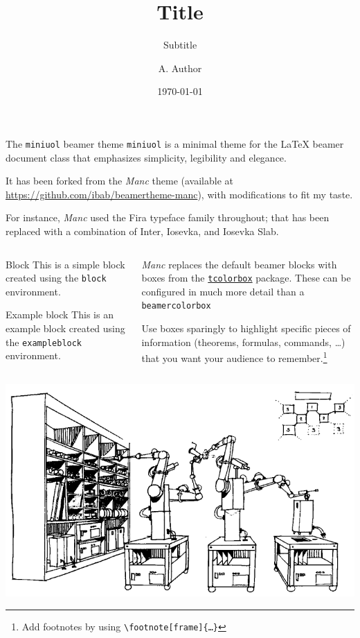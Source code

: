 \documentclass{beamer}
\title{Title}
\subtitle{Subtitle}
\date{\today}
\author{A. Author}
\institute{Institute}
\begin{document}
\begin{frame}
	\titlepage
\end{frame}

\begin{frame}{The \texttt{miniuol} beamer theme}
	\texttt{miniuol} is a minimal theme for the \LaTeX{} beamer document class that emphasizes simplicity, legibility and elegance.

	It has been forked from the \emph{Manc} theme (available at \url{https://github.com/ibab/beamertheme-manc}), with modifications to fit my taste.

	For instance, \emph{Manc} used the Fira typeface family throughout; that has been replaced with a combination of Inter, Iosevka, and Iosevka Slab.
\end{frame}

\begin{frame}[fragile]
	\begin{columns}
		\begin{column}{0.5\textwidth}
			\begin{block}{Block}
				This is a simple block created using the \texttt{block} environment.
			\end{block}
			\begin{exampleblock}{Example block}
				This is an example block created using the \texttt{exampleblock} environment.
			\end{exampleblock}
		\end{column}
		\begin{column}{0.5\textwidth}
			\emph{Manc} replaces the default beamer blocks with boxes from the \href{https://www.ctan.org/pkg/tcolorbox}{\texttt{tcolorbox}} package.
			These can be configured in much more detail than a \texttt{beamercolorbox}
			\medskip

			Use boxes sparingly to highlight specific pieces of information (theorems, formulas, commands, …) that you want your audience to remember.\footnote[frame]{Add footnotes by using \texttt{\backslash footnote[frame]\{…\}}}
		\end{column}
	\end{columns}
\end{frame}

\begin{frame}
	\centering
	\includegraphics[width = \textwidth]{./graphics/self-replicating.png}
\end{frame}
\end{document}
